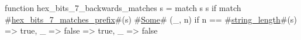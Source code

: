 function hex_bits_7_backwards_matches s = match s {
  s if match #\hyperref[sailRISCVzhexzybitszy7zymatcheszyprefix]{hex\_bits\_7\_matches\_prefix}#(s) {
    #\hyperref[sailRISCVzSome]{Some}# (_, n) if n == #\hyperref[sailRISCVzstringzylength]{string\_length}#(s) => true,
    _ => false
  } => true,
  _ => false
}
